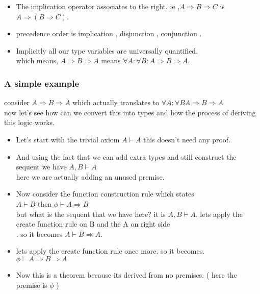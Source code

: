 \documentclass{article}
\begin{document}
\begin{itemize}

\item The implication operator associates to the right. ie ,$ A \Rightarrow B \Rightarrow C $ is $ A \Rightarrow \left( B \Rightarrow C \right) $.
\item precedence  order is implication , disjunction , conjunction .
\item Implicitly all our type variables are universally quantified.\\
  which means, $ A \Rightarrow B \Rightarrow A $ means $ \forall A : \forall B : A \Rightarrow B \Rightarrow A $.  
  
\end{itemize}

\subsubsection{A simple example}
consider $ A \Rightarrow B \Rightarrow A $ which actually translates to $ \forall A : \forall B A \Rightarrow B \Rightarrow A $\\
now let's see how can we convert this into types and how the process of deriving this logic works.
\begin{itemize}
\item Let's start with the trivial axiom $ A \vdash A $ this doesn't  need any proof.
\item And using the fact that we can add extra types and still construct the sequent we have $ A,B \vdash A $\\
  here we are actually adding an unused premise.
\item Now consider the function construction rule which states \\
  $ A \vdash B $ then $ \phi \vdash A \Rightarrow B$\\
  but what is the sequent that we have here? it is $ A,B \vdash A $. lets apply the create function rule on B and the A on right side\\.
  so it becomes $ A \vdash B \Rightarrow A $.
\item lets apply the create function rule once more. so it becomes.\\
  $ \phi \vdash A \Rightarrow B \Rightarrow A $
\item Now this is a theorem because its derived from no premises. ( here the premise is $\phi$ )
\end{itemize}
\end{document}
